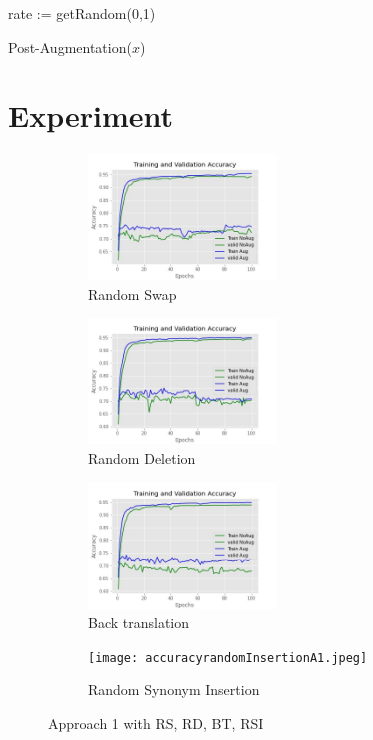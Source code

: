 \documentclass{article}
\begin{document}
\begin{algorithm}[H]
\SetAlgoLined
{}
rate := getRandom(0,1)    
\caption{Post-Augmentation($x$)}
\end{algorithm}












\section{Experiment}
\begin{figure}
  \begin{subfigure}{6cm}
    \centering\includegraphics[width=5cm]{accuracyrandomswapA1.jpg}
    \caption{Random Swap}
  \end{subfigure}
  \begin{subfigure}{6cm}
    \centering\includegraphics[width=5cm]{accuracyrandomdeleteA1.jpg}
    \caption{Random Deletion}
  \end{subfigure}
 
  \begin{subfigure}{6cm}
    \centering\includegraphics[width=5cm]{accuracybacktranslate.jpg}
    \caption{Back translation}
  \end{subfigure}
  \begin{subfigure}{6cm}
    \centering\texttt{[image: accuracyrandomInsertionA1.jpeg]}
    \caption{Random Synonym Insertion}
  \end{subfigure}
  \caption{Approach 1 with RS, RD, BT, RSI}
  \label{fig:preaugmentA1}
\end{figure}
\end{document}

